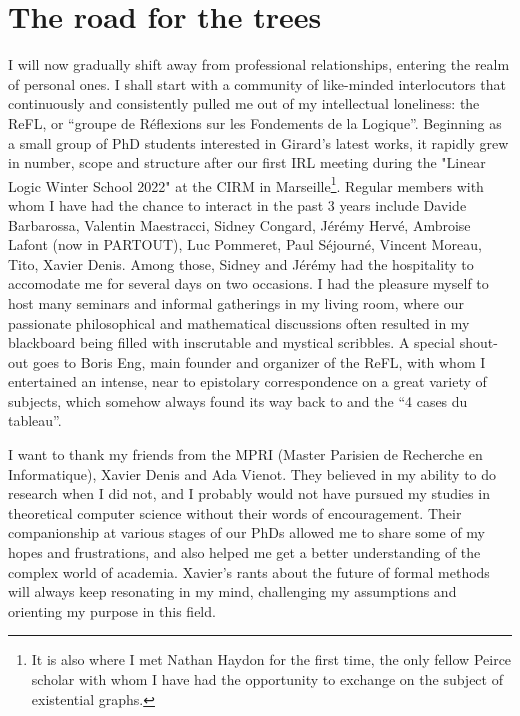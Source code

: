 \section*{The road for the trees}

I will now gradually shift away from professional relationships, entering the realm of personal ones. I shall start with a community of like-minded interlocutors that continuously and consistently pulled me out of my intellectual loneliness: the ReFL, or ``groupe de Réflexions sur les Fondements de la Logique''. Beginning as a small group of PhD students interested in Girard's latest works, it rapidly grew in number, scope and structure after our first IRL meeting during the "Linear Logic Winter School 2022" at the CIRM in Marseille\footnote{It is also where I met Nathan Haydon for the first time, the only fellow Peirce scholar with whom I have had the opportunity to exchange on the subject of existential graphs.}. Regular members with whom I have had the chance to interact in the past 3 years include Davide Barbarossa, Valentin Maestracci, Sidney Congard, Jérémy Hervé, Ambroise Lafont (now in PARTOUT), Luc Pommeret, Paul Séjourné, Vincent Moreau, Tito, Xavier Denis. Among those, Sidney and Jérémy had the hospitality to accomodate me for several days on two occasions. I had the pleasure myself to host many seminars and informal gatherings in my living room, where our passionate philosophical and mathematical discussions often resulted in my blackboard being filled with inscrutable and mystical scribbles. A special shout-out goes to Boris Eng, main founder and organizer of the ReFL, with whom I entertained an intense, near to epistolary correspondence on a great variety of subjects, which somehow always found its way back to  and the ``4 cases du tableau''.

I want to thank my friends from the MPRI (Master Parisien de Recherche en Informatique), Xavier Denis and Ada Vienot. They believed in my ability to do research when I did not, and I probably would not have pursued my studies in theoretical computer science without their words of encouragement. Their companionship at various stages of our PhDs allowed me to share some of my hopes and frustrations, and also helped me get a better understanding of the complex world of academia. Xavier's rants about the future of formal methods will always keep resonating in my mind, challenging my assumptions and orienting my purpose in this field.

